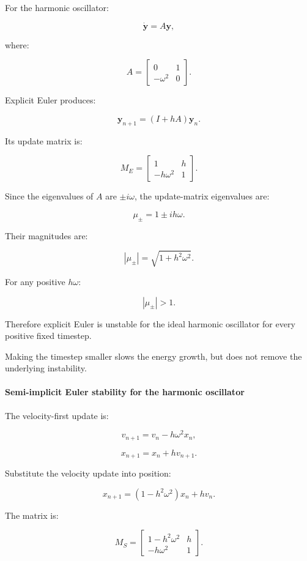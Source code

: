 For the harmonic oscillator:

\[
\dot{\mathbf y}=A\mathbf y,
\]

where:

\[
A= \begin{bmatrix} 0&1\\ -\omega^2&0 \end{bmatrix}.
\]

Explicit Euler produces:

\[
\mathbf y_{n+1}=(I+hA)\mathbf y_n.
\]

Its update matrix is:

\[
\boxed{ M_E= \begin{bmatrix} 1&h\\ -h\omega^2&1 \end{bmatrix} }.
\]

Since the eigenvalues of \(A\) are \(\pm i\omega\), the update-matrix eigenvalues are:

\[
\mu_\pm=1\pm ih\omega.
\]

Their magnitudes are:

\[
|\mu_\pm| = \sqrt{1+h^2\omega^2}.
\]

For any positive \(h\omega\):

\[
\boxed{|\mu_\pm|>1}.
\]

Therefore explicit Euler is unstable for the ideal harmonic oscillator for every positive fixed timestep.

Making the timestep smaller slows the energy growth, but does not remove the underlying instability.

\paragraph{Semi-implicit Euler stability for the harmonic oscillator}\label{02-foundations-ii-ch025-semi-implicit-euler-stability-for-the-harmonic-oscillator}

The velocity-first update is:

\[
v_{n+1}=v_n-h\omega^2x_n,
\]

\[
x_{n+1}=x_n+hv_{n+1}.
\]

Substitute the velocity update into position:

\[
x_{n+1} =(1-h^2\omega^2)x_n+hv_n.
\]

The matrix is:

\[
\boxed{ M_S= \begin{bmatrix} 1-h^2\omega^2&h\\ -h\omega^2&1 \end{bmatrix} }.
\]

